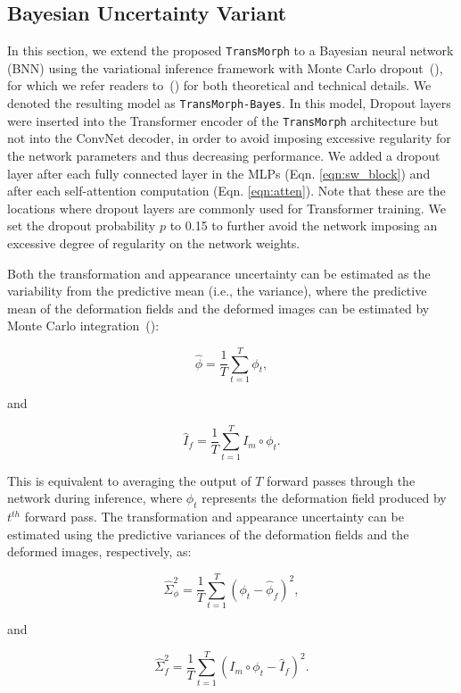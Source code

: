 \documentclass[times,twocolumn,final]{elsarticle}
\begin{document}
\subsection{Bayesian Uncertainty Variant}
\label{sec:bayes_variant}
In this section, we extend the proposed \texttt{TransMorph} to a Bayesian neural network (BNN) using the variational inference framework with Monte Carlo dropout~(\cite{gal2016dropout}), for which we refer readers to~(\cite{gal2016dropout, yang2017fast, yang2016fast}) for both theoretical and technical details. We denoted the resulting model as \texttt{TransMorph-Bayes}. In this model, Dropout layers were inserted into the Transformer encoder of the \texttt{TransMorph} architecture but not into the ConvNet decoder, in order to avoid imposing excessive regularity for the network parameters and thus decreasing performance. We added a dropout layer after each fully connected layer in the MLPs (Eqn. \ref{eqn:sw_block}) and after each self-attention computation (Eqn. \ref{eqn:atten}). Note that these are the locations where dropout layers are commonly used for Transformer training. We set the dropout probability $p$ to 0.15 to further avoid the network imposing an excessive degree of regularity on the network weights.

Both the transformation and appearance uncertainty can be estimated as the variability from the predictive mean (i.e., the variance), where the predictive mean of the deformation fields and the deformed images can be estimated by Monte Carlo integration~(\cite{gal2016dropout}):
\begin{linenomath}
\begin{equation}
\label{eqn:pred_mean_phi}
    \hat{\phi} = \frac{1}{T}\sum^T_{t=1}\phi_t,
\end{equation}
\end{linenomath}
and
\begin{linenomath}
\begin{equation}
\label{eqn:pred_mean}
    \hat{I}_f = \frac{1}{T}\sum^T_{t=1}I_m\circ\phi_t.
\end{equation}
\end{linenomath}
This is equivalent to averaging the output of $T$ forward passes through the network during inference, where $\phi_t$ represents the deformation field produced by $t^{th}$ forward pass. The transformation and appearance uncertainty can be estimated using the predictive variances of the deformation fields and the deformed images, respectively, as:
\begin{linenomath}
\begin{equation}
\label{eqn:pred_var_phi}
    \hat{\Sigma}^2_\phi = \frac{1}{T}\sum^T_{t=1}\left(\phi_t - \hat{\phi}_f\right)^2,
\end{equation}
\end{linenomath}
and
\begin{linenomath}
\begin{equation}
\label{eqn:pred_var_0}
    \hat{\Sigma}^2_f = \frac{1}{T}\sum^T_{t=1}\left(I_m\circ\phi_t - \hat{I}_f\right)^2.
\end{equation}
\end{linenomath}
\end{document}
